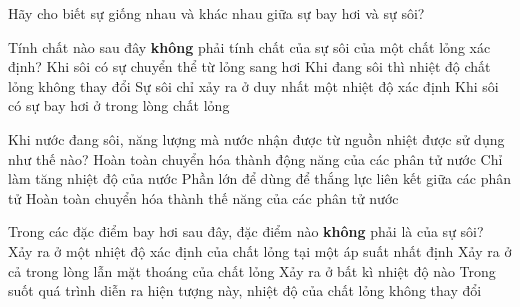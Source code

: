 \begin{ex} 
	Hãy cho biết sự giống nhau và khác nhau giữa sự bay hơi và sự sôi? 
\end{ex}
\begin{ex}
	Tính chất nào sau đây \textbf{không} phải tính chất của sự sôi của một chất lỏng xác định?
	\choice
	{Khi sôi có sự chuyển thể từ lỏng sang hơi}
	{Khi đang sôi thì nhiệt độ chất lỏng không thay đổi}
	{\True Sự sôi chỉ xảy ra ở duy nhất một nhiệt độ xác định}
	{Khi sôi có sự bay hơi ở trong lòng chất lỏng}
	\end{ex}
\begin{ex}
	Khi nước đang sôi, năng lượng mà nước nhận được từ nguồn nhiệt được sử dụng như thế nào?
	\choice
	{Hoàn toàn chuyển hóa thành động năng của các phân tử nước}
	{Chỉ làm tăng nhiệt độ của nước}
	{\True Phần lớn để dùng để thắng lực liên kết giữa các phân tử}
	{Hoàn toàn chuyển hóa thành thế năng của các phân tử nước}
	\end{ex}



\begin{ex} 
	Trong các đặc điểm bay hơi sau đây, đặc điểm nào \textbf{không} phải là của sự sôi?
	\choice
	{Xảy ra ở một nhiệt độ xác định của chất lỏng tại một áp suất nhất định}
	{Xảy ra ở cả trong lòng lẫn mặt thoáng của chất lỏng}
	{\True Xảy ra ở bất kì nhiệt độ nào}
	{Trong suốt quá trình diễn ra hiện tượng này, nhiệt độ của chất lỏng không thay đổi}
\end{ex}

